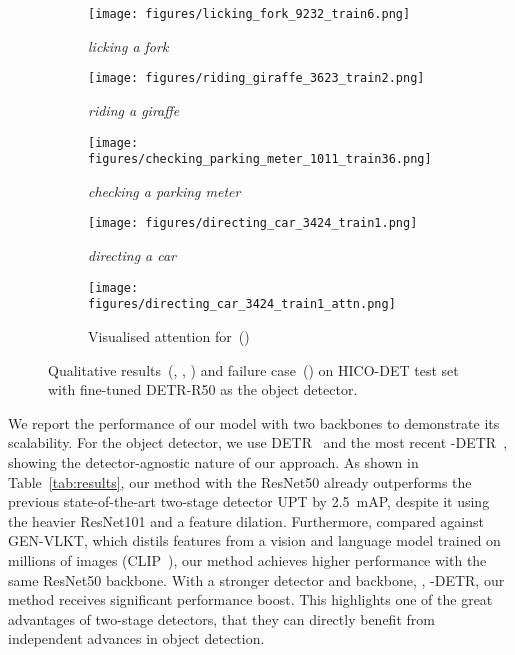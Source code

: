 \documentclass[10pt,twocolumn,letterpaper]{article}
\begin{document}
\begin{figure*}[t]\captionsetup[subfigure]{font=footnotesize}
   \begin{subfigure}[t]{0.195\linewidth}
     \centering
     \texttt{[image: figures/licking\_fork\_9232\_train6.png]}
     \caption{\textit{licking a fork}}
     \label{fig:qual-licking-fork}
   \end{subfigure}
   \hfill
   \begin{subfigure}[t]{0.195\linewidth}
     \centering
     \texttt{[image: figures/riding\_giraffe\_3623\_train2.png]}
     \caption{\textit{riding a giraffe}}
     \label{fig:qual-riding-giraffe}
   \end{subfigure}
   \hfill
   \begin{subfigure}[t]{0.195\linewidth}
     \centering
     \texttt{[image: figures/checking\_parking\_meter\_1011\_train36.png]}
     \caption{\textit{checking a parking meter}}
     \label{fig:qual-checking-meter}
   \end{subfigure}
   \hfill
   \begin{subfigure}[t]{0.195\linewidth}
      \centering
      \texttt{[image: figures/directing\_car\_3424\_train1.png]}
      \caption{\textit{directing a car}}
      \label{fig:fail-directing-car}
   \end{subfigure}
   \hfill
   \begin{subfigure}[t]{0.195\linewidth}
      \centering
      \texttt{[image: figures/directing\_car\_3424\_train1\_attn.png]}
      \caption{Visualised attention for~()}
      \label{fig:fail-directing-car-attn}
   \end{subfigure}
   \vspace{5px}
   \caption{Qualitative results~(, , ) and failure case~() on HICO-DET test set with fine-tuned DETR-R50 as the object detector.}
   \label{fig:qual}
   \vspace*{-3px}
\end{figure*}

We report the performance of our model with two backbones to demonstrate its scalability. For the object detector, we use DETR~\cite{detr} and the most recent -DETR~\cite{hdetr}, showing the detector-agnostic nature of our approach. As shown in Table~\ref{tab:results}, our method with the ResNet50 already outperforms the previous state-of-the-art two-stage detector UPT by 2.5~mAP, despite it using the heavier ResNet101 and a feature dilation. Furthermore, compared against GEN-VLKT, which distils features from a vision and language model trained on millions of images (CLIP~\cite{clip}), our method achieves higher performance with the same ResNet50 backbone. With a stronger detector and backbone, \ie, -DETR, our method receives significant performance boost. This highlights one of the great advantages of two-stage detectors, that they can directly benefit from independent advances in object detection.
\end{document}
